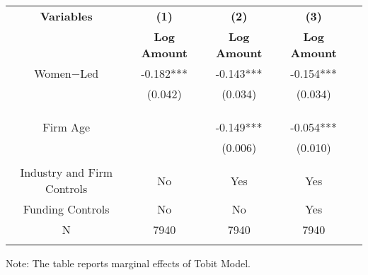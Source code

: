  \begin{table}[htbp]
    \begin{tabular}{c c c c c}
    \toprule
    \textbf{Variables} & \textbf{(1)} & \textbf{(2)} & \textbf{(3)}               \\ 
    \textbf & \textbf{Log Amount} & \textbf{Log Amount} & \textbf{Log Amount}  \\ 

    \midrule
     Women$-$Led        & -0.182***   &      -0.143*** &       -0.154***   \\
                        &  (0.042)    &      (0.034)   &        (0.034)  \\
                        &             &                &                \\

                        &             &                &               \\
                        &             &                &         \\
    Firm Age            &             &      -0.149*** &     -0.054***    \\
                        &             &      (0.006)   &      (0.010)       \\
                        &             &                &                  \\
    
Industry and Firm Controls   &   No        &   Yes       &        Yes    \\
    Funding Controls    &   No             &   No        &         Yes        \\

    \midrule
     N                  &   7940          &      7940  &     7940        \\          
    \bottomrule
    \addlinespace[1ex]
    \multicolumn{3}{l}{\textsuperscript{***}$p<0.01$, 
      \textsuperscript{**}$p<0.05$, 
      \textsuperscript{*}$p<0.1$}
    \end{tabular}
    Note: The table reports marginal effects of Tobit Model.
\end{table}

